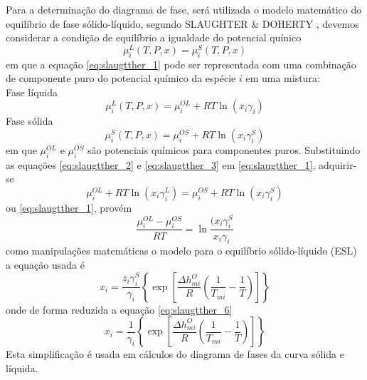	\hspace{5mm} Para a determinação do diagrama de fase, será utilizada o modelo matemático do equilíbrio de fase sólido-líquido, segundo SLAUGHTER \& DOHERTY \citeyear{Douglas1995}, devemos considerar a condição de equilíbrio a igualdade do potencial quínico
	\begin{equation}\label{eq:slaugtther_1}
	\mu_{i}^{L}(T,P,x)=\mu_{i}^{S}(T,P,x)
	\end{equation}
	em que a equação \ref{eq:slaugtther_1} pode ser representada com uma combinação de componente puro do potencial químico da espécie $i$ em uma mistura:
	\\ Fase líquida
	\begin{equation}\label{eq:slaugtther_2}
	\mu_{i}^{L}(T,P,x)=\mu_{i}^{OL}+RT\ln(x_i\gamma_{i})
	\end{equation}
	Fase sólida 
	\begin{equation}\label{eq:slaugtther_3}
	\mu_{i}^{S}(T,P,x)=\mu_{i}^{OS}+RT\ln(x_i\gamma_{i}^{S})
	\end{equation}
	em que $\mu_{i}^{OL}$ e $\mu_{i}^{OS}$ são potenciais químicos para componentes puros. 
	Substituindo as equações \ref{eq:slaugtther_2} e \ref{eq:slaugtther_3} em \ref{eq:slaugtther_1}, adquirir-se
	\begin{equation}\label{eq:slaugtther_4}
	\mu_{i}^{OL}+RT\ln(x_i\gamma_{i}^{L})=\mu_{i}^{OS}+RT\ln(x_i\gamma_{i}^{S})
	\end{equation}
	ou
	\ref{eq:slaugtther_1}, provém
	\begin{equation}\label{eq:slaugtther_5}
	\dfrac{\mu_{i}^{OL}-\mu_{i}^{OS}}{RT}=\ln\dfrac{(x_i\gamma_{i}^{S}}{x_i\gamma_{i}}
	\end{equation}
	como manipulações matemáticas o modelo para o equilíbrio sólido-líquido (ESL) a equação usada é
	\begin{equation}\label{eq:slaugtther_6}
	x_i=\dfrac{z_i\gamma_{i}^{S}}{\gamma_{i}}\left\{\exp\left[\dfrac{\Delta h_{mi}^{O}}{R}\left(\dfrac{1}{T_ {mi}}-\dfrac{1}{T}\right)\right]\right\}
	\end{equation}
	onde de forma reduzida a equação \ref{eq:slaugtther_6}
	\begin{equation}\label{eq:slaugtther_7}
	x_i=\dfrac{1}{\gamma_{i}}\left\{\exp\left[\dfrac{\Delta h_{mi}^{O}}{R}\left(\dfrac{1}{T_ {mi}}-\dfrac{1}{T}\right)\right]\right\}
	\end{equation}
	Esta simplificação é usada em cálculos do diagrama de fases da curva sólida e líquida. 
	
